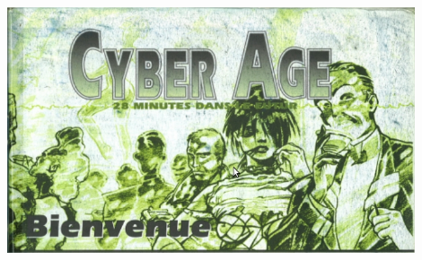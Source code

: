 \documentclass[40pt,twoside,a4paper]{article}
\def\confidentialDGTIKZ{%
	\begin{tikzpicture}[remember picture,overlay]
	\node[rotate=60,scale=7.5,text opacity=0.2] at (current page.center) {Confidential -- Delta Green};
	\end{tikzpicture}
}%
\begin{document}
\setlength\parindent{0pt}


\begin{center} 
	\includegraphics[width=0.90\textwidth]{img/CyberAgeBienvenue.jpeg} %
\end{center}
\end{document}
